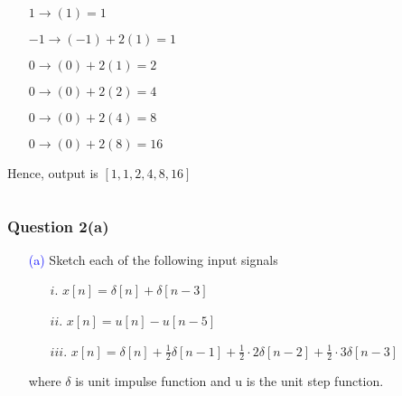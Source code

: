 \documentclass{beamer}
\newcommand{\blue}[1]{\textcolor{blue}{#1}}
\begin{document}
\begin{frame}
\begin{columns}
\begin{column}{6 cm}
\begin{itemize} \itemsep1pt \parskip0pt 
  \item[] \hspace{5 mm}$1 \rightarrow $\hspace{5 mm}$(1) $\hspace{17 mm}$= 1$
  \item[] \hspace{2 mm}$-1 \rightarrow $\hspace{2 mm}$(-1) + 2(1) $\hspace{5.5 mm}$= 1$
  \item[] \hspace{5 mm}$0 \rightarrow $\hspace{5 mm}$(0) + 2(1) $\hspace{5.5 mm}$= 2$
  \item[] \hspace{5 mm}$0 \rightarrow $\hspace{5 mm}$(0) + 2(2) $\hspace{5.3 mm}$= 4$
  \item[] \hspace{5 mm}$0 \rightarrow $\hspace{5 mm}$(0) + 2(4) $\hspace{5 mm}$= 8$
  \item[] \hspace{5 mm}$0 \rightarrow $\hspace{5 mm}$(0) + 2(8) $\hspace{5 mm}$= 16$
\end{itemize}
Hence, output is $[1,1,2,4,8,16]$
\vspace{2 cm}

\end{column}
\end{columns}
\end{frame}


\begin{frame}
\frametitle{Question 2(a)}

\begin{itemize} \itemsep6pt \parskip0pt 
  \item[\blue{(a)}] Sketch each of the following input signals
  \begin{itemize} \itemsep1pt \parskip0pt 
    \item[$i.$] $x[n] = \delta[n] + \delta[n-3]$
    \item[$ii.$] $x[n] = u[n] - u[n-5]$
    \item[$iii.$] $x[n] = \delta[n] + \frac{1}{2}\delta[n-1] + \frac{1}{2} \cdot 2\delta[n-2] + \frac{1}{2}\cdot 3\delta[n-3]$
  \end{itemize}
  where $\delta$ is unit impulse function and u is the unit step function.
\end{itemize}


\end{frame}
\end{document}
